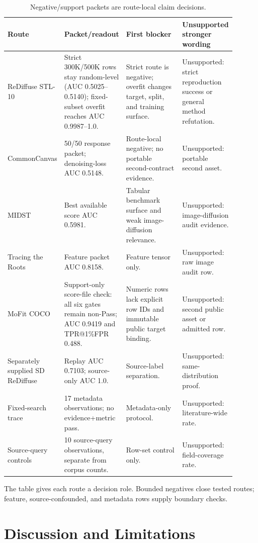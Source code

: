 \documentclass[10pt,conference]{IEEEtran}
\begin{document}
\begin{table}[t]
\centering
\caption{Negative/support packets are route-local claim decisions.}
\label{tab:negative-support}
\scriptsize
\setlength{\tabcolsep}{2pt}
\begin{tabular}{@{}L{0.22\linewidth}L{0.27\linewidth}L{0.25\linewidth}L{0.16\linewidth}@{}}
\toprule
Route & Packet/readout & First blocker & Unsupported stronger wording \\
\midrule
ReDiffuse STL-10 & Strict 300K/500K rows stay random-level (AUC 0.5025--0.5140); fixed-subset overfit reaches AUC 0.9987--1.0. & Strict route is negative; overfit changes target, split, and training surface. & Unsupported: strict reproduction success or general method refutation. \\
CommonCanvas & 50/50 response packet; denoising-loss AUC 0.5148. & Route-local negative; no portable second-contract evidence. & Unsupported: portable second asset. \\
MIDST & Best available score AUC 0.5981. & Tabular benchmark surface and weak image-diffusion relevance. & Unsupported: image-diffusion audit evidence. \\
Tracing the Roots & Feature packet AUC 0.8158. & Feature tensor only. & Unsupported: raw image audit row. \\
MoFit COCO & Support-only score-file check: all six gates remain non-Pass; AUC 0.9419 and TPR@1\%FPR 0.488. & Numeric rows lack explicit row IDs and immutable public target binding. & Unsupported: second public asset or admitted row. \\
Separately supplied SD ReDiffuse & Replay AUC 0.7103; source-only AUC 1.0. & Source-label separation. & Unsupported: same-distribution proof. \\
Fixed-search trace & 17 metadata observations; no evidence+metric pass. & Metadata-only protocol. & Unsupported: literature-wide rate. \\
Source-query controls & 10 source-query observations, separate from corpus counts. & Row-set control only. & Unsupported: field-coverage rate. \\
\bottomrule
\end{tabular}
\end{table}

The table gives each route a decision role. Bounded negatives close tested
routes; feature, source-confounded, and metadata rows supply boundary checks.

\section{Discussion and Limitations}
\label{sec:discussion}
\end{document}
